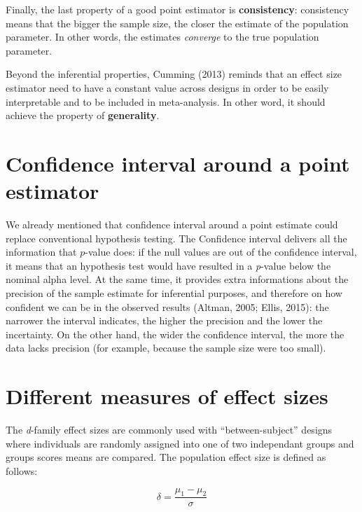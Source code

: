 \documentclass[
  man,floatsintext]{apa6}
\begin{document}
Finally, the last property of a good point estimator is \textbf{consistency}: consistency means that the bigger the sample size, the closer the estimate of the population parameter. In other words, the estimates \emph{converge} to the true population parameter.

Beyond the inferential properties, Cumming (2013) reminds that an effect size estimator need to have a constant value across designs in order to be easily interpretable and to be included in meta-analysis. In other word, it should achieve the property of \textbf{generality}.

\hypertarget{confidence-interval-around-a-point-estimator}{%
\section{Confidence interval around a point estimator}\label{confidence-interval-around-a-point-estimator}}

We already mentioned that confidence interval around a point estimate could replace conventional hypothesis testing. The Confidence interval delivers all the information that \(p\)-value does: if the null values are out of the confidence interval, it means that an hypothesis test would have resulted in a \emph{p}-value below the nominal alpha level. At the same time, it provides extra informations about the precision of the sample estimate for inferential purposes, and therefore on how confident we can be in the observed results (Altman, 2005; Ellis, 2015): the narrower the interval indicates, the higher the precision and the lower the incertainty. On the other hand, the wider the confidence interval, the more the data lacks precision (for example, because the sample size were too small).

\hypertarget{different-measures-of-effect-sizes}{%
\section{Different measures of effect sizes}\label{different-measures-of-effect-sizes}}

The \emph{d}-family effect sizes are commonly used with \enquote{between-subject} designs where individuals are randomly assigned into one of two independant groups and groups scores means are compared. The population effect size is defined as follows:

\begin{equation} 
\delta = \frac{\mu_{1}-\mu_{2}}{\sigma} 
\label{eq:Cohendelta}
\end{equation}
\end{document}

